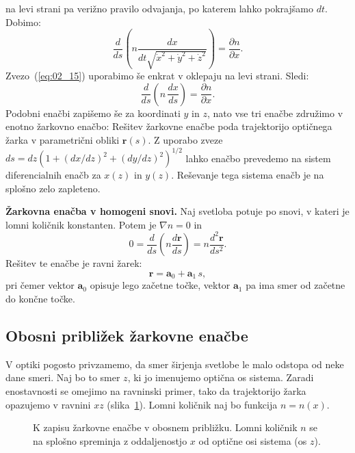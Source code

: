 na levi strani pa verižno pravilo odvajanja, po katerem lahko pokrajšamo $dt$. Dobimo:
\begin{equation}
 \frac{d}{ds} \left( n \frac{dx}{dt\sqrt{\dot{x}^2+ \dot{y}^2+\dot{z}^2}} \right)=
 \frac{\partial n}{\partial x}.
 \label{eq:02_16}
\end{equation}
Zvezo~(\ref{eq:02_15}) uporabimo še enkrat v oklepaju na levi strani. Sledi:
\begin{equation}
 \frac{d}{ds} \left( n\, \frac{dx}{ds} \right)=
 \frac{\partial n}{\partial x}.
  \label{eq:02_17}
\end{equation}
Podobni enačbi zapišemo še za koordinati $y$ in $z$, nato vse tri enačbe
združimo v enotno žarkovno enačbo:
Rešitev žarkovne enačbe poda trajektorijo optičnega žarka v parametrični 
obliki $\mathbf{r}(s)$. Z uporabo zveze $ds = dz (1+(dx/dz)^2+(dy/dz)^2)^{1/2}$
lahko enačbo prevedemo na sistem diferencialnih enačb za $x(z)$ in $y(z)$. Reševanje
tega sistema enačb je na splošno zelo zapleteno.

\begin{example}
{\bf Žarkovna enačba v homogeni snovi.} Naj svetloba potuje po snovi,
v kateri je lomni količnik konstanten. Potem je $\nabla n = 0$ in 
\begin{equation}
0 = \frac{d}{ds}\left( n \frac{d\mathbf{r}}{ds} \right) = 
n \frac{d^2 \mathbf{r}}{ds^2}.
 \label{eq:02_18}
\end{equation}
Rešitev te enačbe je ravni žarek:
\begin{equation}
 \mathbf{r} = \mathbf{a}_0+\mathbf{a}_1\,s,
  \label{eq:02_19}
\end{equation}
pri čemer vektor $\mathbf{a}_0$ opisuje lego začetne točke, 
vektor $\mathbf{a}_1$ pa ima smer od začetne do končne točke.
\end{example}

\subsection*{Obosni približek žarkovne enačbe}
V optiki pogosto privzamemo, da smer širjenja svetlobe le malo 
odstopa od neke dane smeri. Naj bo to smer $z$, ki jo imenujemo
optična os sistema. 
Zaradi enostavnosti se omejimo na ravninski primer, 
tako da trajektorijo žarka opazujemo v ravnini $xz$ 
(slika~\ref{fig:02_FerOs}). Lomni količnik naj bo funkcija $n= n(x)$.
\begin{figure}[ht]
\centering
\def\svgwidth{90truemm} 

\caption{K zapisu žarkovne enačbe v obosnem približku. Lomni količnik $n$ se na splošno
spreminja z oddaljenostjo $x$ od optične osi sistema (os $z$).}
\label{fig:02_FerOs}
\end{figure}

